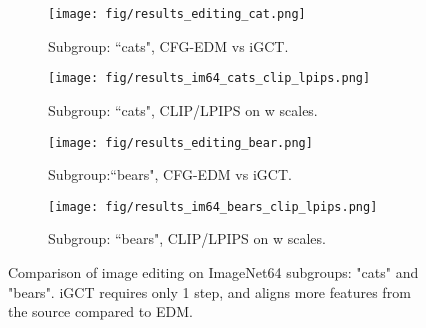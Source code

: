 \begin{figure}[t!]  
    \centering
    \begin{subfigure}[b]{0.39\textwidth}
    \texttt{[image: fig/results\_editing\_cat.png]} 
        \vspace{-1em}
        \caption{Subgroup: ``cats", CFG-EDM vs iGCT.}
    \end{subfigure}
    
    \begin{subfigure}[b]{0.39\textwidth}
    \texttt{[image: fig/results\_im64\_cats\_clip\_lpips.png]} 
        \vspace{-1em}
        \caption{Subgroup: ``cats", CLIP/LPIPS on w scales.}
    \end{subfigure}
    
    \begin{subfigure}[b]{0.39\textwidth}
    \texttt{[image: fig/results\_editing\_bear.png]} 
        \vspace{-1em}
        \caption{Subgroup:``bears", CFG-EDM vs iGCT.}
    \end{subfigure}
    
    \begin{subfigure}[b]{0.39\textwidth}
    \texttt{[image: fig/results\_im64\_bears\_clip\_lpips.png]} 
        \vspace{-1em}
        \caption{Subgroup: ``bears", CLIP/LPIPS on w scales.}
    \end{subfigure}
    \vspace{-1.1em}
    \caption{Comparison of image editing on ImageNet64 subgroups: "cats" and "bears". iGCT requires only 1 step, and aligns more features from the source compared to EDM. }
    \vspace{-1.3em}
    \label{fig:results_im64_image_editing}
\end{figure}



